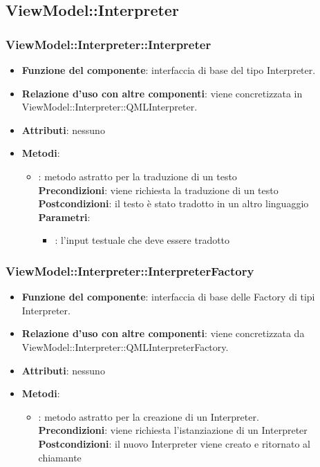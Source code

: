 \subsection{ViewModel::Interpreter}
\subsubsection{ViewModel::Interpreter::Interpreter}
\begin{itemize}
\item\textbf{Funzione del componente}: interfaccia di base del tipo Interpreter.
	\item\textbf{Relazione d'uso con altre componenti}: viene concretizzata in ViewModel::Interpreter::QMLInterpreter.\\

\item\textbf{Attributi}: nessuno
\item\textbf{Metodi}:
	\begin{itemize}
		\item{}: metodo astratto per la traduzione di un testo\\
		\textbf{Precondizioni}: viene richiesta la traduzione di un testo\\
		\textbf{Postcondizioni}: il testo è stato tradotto in un altro linguaggio\\
		\textbf{Parametri}:
			\begin{itemize}
				\item{}: l'input testuale che deve essere tradotto \\
			\end{itemize}
	\end{itemize}
\end{itemize}

\subsubsection{ViewModel::Interpreter::InterpreterFactory}
\begin{itemize}
\item\textbf{Funzione del componente}: interfaccia di base delle Factory di tipi Interpreter.
	\item\textbf{Relazione d'uso con altre componenti}: viene concretizzata da ViewModel::Interpreter::QMLInterpreterFactory.\\ 
\item\textbf{Attributi}: nessuno
\item\textbf{Metodi}:
	\begin{itemize}
		\item{}: metodo astratto per la creazione di un Interpreter.\\
		\textbf{Precondizioni}: viene richiesta l'istanziazione di un Interpreter\\
		\textbf{Postcondizioni}: il nuovo Interpreter viene creato e ritornato al chiamante\\
	\end{itemize}
\end{itemize}

